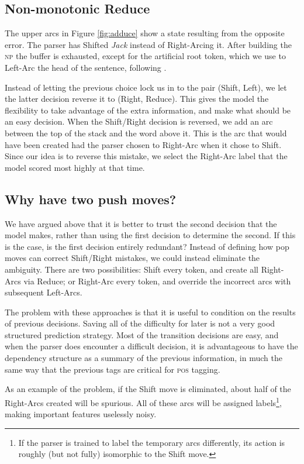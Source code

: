 \documentclass[11pt,letterpaper]{article}
\newcommand{\pos}{\textsc{pos}\xspace}
\begin{document}
\subsection{Non-monotonic Reduce}

The upper arcs in Figure \ref{fig:adduce} show a state resulting from the opposite error.
The parser has Shifted \emph{Jack} instead of Right-Arcing it. After
building the \textsc{np} the buffer is exhausted, except for the artificial root token,
which we use to Left-Arc the head of the sentence, following \citet{nivre:squib}.

Instead of letting the previous choice lock us in to the pair (Shift, Left), we let
the latter decision reverse it to (Right, Reduce). This gives the model the flexibility
to take advantage of the extra information, and make what should be an easy decision.
When the Shift/Right decision is reversed, we add an arc between the top of the stack
and the word above it. This is the arc that would have been created had the parser
chosen to Right-Arc when it chose to Shift. Since our idea is to reverse this mistake,
we select the Right-Arc label that the model scored most highly at that time.


\subsection{Why have two push moves?}

We have argued above that it is better to trust the second decision that the model
makes, rather than using the first decision to determine the second. If this is
the case, is the first decision entirely redundant?
Instead of defining how pop moves can correct Shift/Right mistakes, we could
instead eliminate the ambiguity. There are two possibilities:
Shift every token, and create all Right-Arcs via Reduce; or Right-Arc every token,
and override the incorrect arcs with subsequent Left-Arcs.

The problem with these approaches is that it is useful to condition
on the results of previous decisions. Saving all of the difficulty for later
is not a very good structured prediction strategy. Most of the transition decisions are
easy, and when the parser does encounter a difficult decision, it is advantageous
to have the dependency structure as a summary of the previous information, in
much the same way that the previous tags are critical for \pos tagging. 

As an example of the problem, if the Shift move is
eliminated, about half of the Right-Arcs created will be spurious. All of these
arcs will be assigned labels\footnote{If the parser is trained to label the temporary
arcs differently, its action is roughly (but not fully) isomorphic to the Shift move.},
making important features uselessly noisy.
\end{document}
